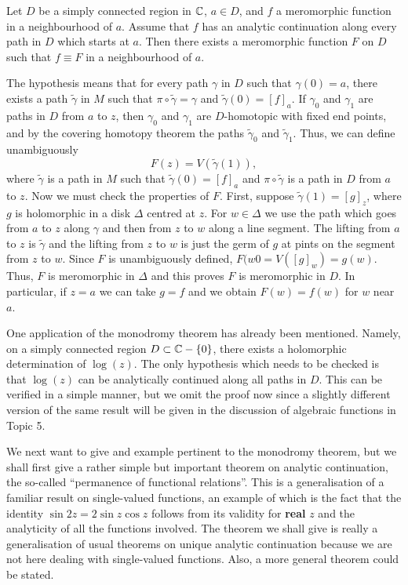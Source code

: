 \documentclass[a4paper,11pt]{article}
\newcounter{topic}
\begin{document}
\begin{thm}
  Let $D$ be a simply connected region in ${\mathbb C}$, $a \in D$, and $f$ a
  meromorphic function in a neighbourhood of $a$.  Assume that $f$ has
  an analytic continuation along every path in $D$ which starts at
  $a$.  Then there exists a meromorphic function $F$ on $D$ such that
  $f \equiv F$ in a neighbourhood of $a$.
\end{thm}

\begin{myproof}
  The hypothesis means that for every path $\gamma$ in $D$ such that
  $\gamma(0) = a$, there exists a path $\widetilde{\gamma}$ in $M$
  such that $\pi \circ \widetilde{\gamma} = \gamma$ and
  $\widetilde{\gamma}(0) = [f]_a$.  If $\gamma_0$ and $\gamma_1$ are
  paths in $D$ from $a$ to $z$, then $\gamma_0$ and $\gamma_1$ are
  $D$-homotopic with fixed end points, and by the covering homotopy
  theorem the paths $\widetilde{\gamma}_0$ and
  $\widetilde{\gamma}_1$.  Thus, we can define unambiguously
  $$
  F(z) = V(\widetilde{\gamma}(1)),
  $$
  where $\widetilde{\gamma}$ is a path in $M$ such that
  $\widetilde{\gamma}(0) = [f]_a$ and $\pi \circ \widetilde{\gamma}$
  is a path in $D$ from $a$ to $z$.  Now we must check the properties
  of $F$.
  First, suppose $\widetilde{\gamma}(1) = [g]_z$, where $g$ is
  holomorphic in a disk $\Delta$ centred at $z$.  For $w \in \Delta$
  we use the path which goes from $a$ to $z$ along $\gamma$ and then
  from $z$ to $w$ along a line segment.  The lifting from $a$ to $z$
  is $\widetilde{\gamma}$ and the lifting from $z$ to $w$ is just the
  germ of $g$ at pints on the segment from $z$ to $w$.  Since $F$ is
  unambiguously defined, $F(w0 = V([g]_w) = g(w)$.  Thus, $F$ is
  meromorphic in $\Delta$ and this proves $F$ is meromorphic in $D$.
  In particular, if $z = a$ we can take $g = f$ and we obtain $F(w) =
  f(w)$ for $w$ near $a$.
\end{myproof}

One application of the monodromy theorem has already been mentioned.
Namely, on a simply connected region $D \subset {\mathbb C} - \{0\}$, there
exists a holomorphic determination of $\log(z)$.  The only hypothesis
which needs to be checked is that $\log(z)$ can be analytically
continued along  all paths in $D$.  This can be verified in a simple
manner, but we omit the proof now since a slightly different version
of the same result will be given in the discussion of algebraic
functions in Topic 5.

We next want to give and example pertinent to the monodromy theorem,
but we shall first give a rather simple but important theorem on
analytic continuation, the so-called ``permanence of functional
relations''.  This is a generalisation of a familiar result on
single-valued functions, an example of which is the fact that the
identity $\sin 2z = 2\sin z \cos z$ follows from its validity for
\textbf{real} $z$ and the analyticity of all the functions involved.
The theorem we shall give is really a generalisation of usual theorems
on unique analytic continuation because we are not here dealing with
single-valued functions.  Also, a more general theorem could be
stated.
\end{document}
